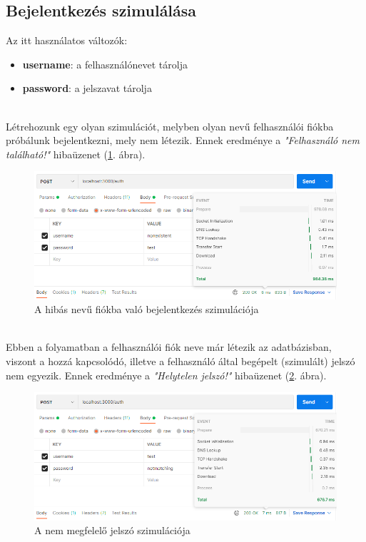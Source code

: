 \subsection{Bejelentkezés szimulálása}

Az itt használatos változók:

\begin{itemize}
\item{\textbf{username}: a felhasználónevet tárolja}
\item{\textbf{password}: a jelszavat tárolja}
\end{itemize}

\newpage

\\

Létrehozunk egy olyan szimulációt, melyben olyan nevű felhasználói fiókba próbálunk bejelentkezni, mely nem létezik. Ennek eredménye a \textit{"Felhasználó nem található!"} hibaüzenet (\ref{fig:loginNoUser}. ábra).

\begin{figure}[h]
	\centering
		\includegraphics[width=15truecm, height=7truecm]{images/loginNoUser.png}
	\caption{A hibás nevű fiókba való bejelentkezés szimulációja}
	\label{fig:loginNoUser}
\end{figure}

\\

Ebben a folyamatban a felhasználói fiók neve már létezik az adatbázisban, viszont a hozzá kapcsolódó, illetve a felhasználó által begépelt (szimulált) jelszó nem egyezik. Ennek eredménye a \textit{"Helytelen jelszó!"} hibaüzenet (\ref{fig:loginBadPW}. ábra).

\begin{figure}[h]
	\centering
		\includegraphics[width=15truecm, height=7truecm]{images/loginBadPW.png}
	\caption{A nem megfelelő jelszó szimulációja}
	\label{fig:loginBadPW}
\end{figure}

